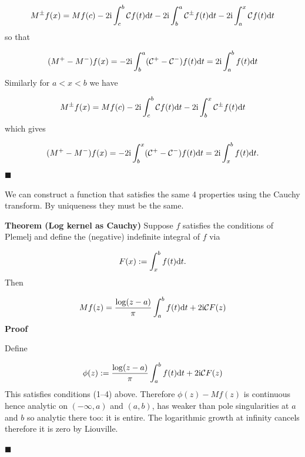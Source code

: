 \documentclass[12pt,a4paper]{article}
\def\D{ {\rm d} }
\def\I{ {\rm i} }
\def\CC{ {\cal C} }
\def\endash{–}
\begin{document}
\[
M^\pm f(x) = Mf(c) -2 \I \int_c^b \CC f(t) \D t -2 \I \int_b^a \CC^\pm f(t) \D t -2 \I \int_a^x \CC f(t) \D t
\]
so that

\[
(M^+ - M^-) f(x) = -2 \I \int_b^a (\CC^+ - \CC^-) f(t) \D t  = 2 \I \int_a^b f(t) \D t
\]
Similarly for $a < x < b$ we have

\[
M^\pm f(x) = Mf(c) -2 \I \int_c^b \CC f(t) \D t -2 \I \int_b^x \CC^\pm f(t) \D t 
\]
which gives

\[
(M^+ - M^-) f(x) = -2 \I \int_b^x (\CC^+ - \CC^-) f(t) \D t  = 2 \I \int_x^b f(t) \D t.
\]
\ensuremath{\blacksquare}

We can construct a function that satisfies the same 4 properties using the Cauchy transform. By uniqueness they must be the same.

\textbf{Theorem (Log kernel as Cauchy)}  Suppose $f$ satisfies the conditions of Plemelj and define the (negative) indefinite integral of $f$ via 

\[
F(x) := \int_x^b f(t) \D t.
\]
Then

\[
M f(z) = {\log(z-a) \over \pi} \int_a^b f(t) \D t + 2 \I \CC F(z)
\]
\textbf{Proof}

Define

\[
\phi(z) := {\log(z-a) \over \pi} \int_a^b f(t) \D t + 2 \I \CC F(z)
\]
This satisfies conditions (1\ensuremath{\endash}4) above. Therefore $\phi(z) - M f(z)$ is continuous hence analytic on $(-\infty,a)$ and $(a,b)$, has weaker than pole singularities at $a$ and $b$ so analytic there too: it is entire. The logarithmic growth at infinity cancels therefore it is zero by Liouville.

\ensuremath{\blacksquare}
\end{document}
